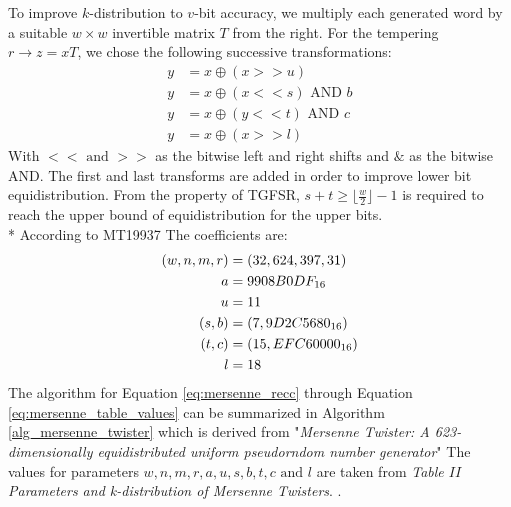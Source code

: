 \documentclass[12pt,journal,compsoc]{IEEEtran}
\begin{document}
To improve $k$-distribution to $v$-bit accuracy, we multiply each generated word by a suitable $w \times w$ invertible matrix $T$ from the right. For the tempering $r \rightarrow z = xT$, we chose the following successive transformations:
\begin{align}
y &= x \oplus (x>>u) \\
y &= x \oplus (x<<s) \text{ AND } b \\
y &= x \oplus (y << t) \text{ AND } c \\
y &= x \oplus (x >> l)
\end{align}
With $<< \text{ and }>>$ as the bitwise left and right shifts and $\&$ as the bitwise AND. The first and last transforms are added in order to improve lower bit equidistribution. From the property of TGFSR, $s+t \geq \lfloor \frac{w}{2}\rfloor -1$ is required to reach the upper bound of equidistribution for the upper bits. \\*
According to MT19937\cite{MT19937} The coefficients are:
\begin{align}
(w,n,m,r) &= (32, 624, 397, 31) \notag \\
a &= 9908B0DF_{16} \notag\\
u &= 11 \notag \\
(s, b) &= (7, 9D2C5680_{16}) \notag \\
(t, c) &= (15, EFC60000_{16}) \notag \\
l &= 18
\label{eq:mersenne_table_values}
\end{align}
The algorithm for Equation \ref{eq:mersenne_recc} through Equation \ref{eq:mersenne_table_values} can be summarized in Algorithm \ref{alg_mersenne_twister} which is derived from "\emph{Mersenne Twister: A 623-dimensionally equidistributed uniform pseudorndom number generator}"\cite{MT19937} The values for parameters $w, n, m, r, a, u, s, b, t, c \text{ and }l$ are taken from \emph{Table $II$ Parameters and k-distribution of Mersenne Twisters}\cite{MT19937}. .
\end{document}
